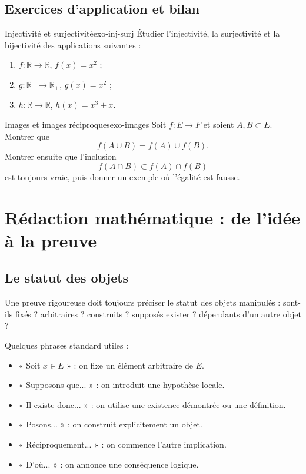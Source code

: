 \documentclass[11pt,a4paper]{article}
\newcommand{\R}{\mathbb{R}}
\begin{document}
\subsection{Exercices d'application et bilan}

\begin{exercicebox}{Injectivité et surjectivité}{exo-inj-surj}
Étudier l'injectivité, la surjectivité et la bijectivité des applications suivantes :
\begin{enumerate}
  \item $f:\R\to\R$, $f(x)=x^2$ ;
  \item $g:\R_+\to\R_+$, $g(x)=x^2$ ;
  \item $h:\R\to\R$, $h(x)=x^3+x$.
\end{enumerate}
\end{exercicebox}

\begin{exercicebox}{Images et images réciproques}{exo-images}
Soit $f:E\to F$ et soient $A,B\subset E$. Montrer que
\[
f(A\cup B)=f(A)\cup f(B).
\]
Montrer ensuite que l'inclusion
\[
f(A\cap B)\subset f(A)\cap f(B)
\]
est toujours vraie, puis donner un exemple où l'égalité est fausse.
\end{exercicebox}

\section{Rédaction mathématique : de l'idée à la preuve}

\subsection{Le statut des objets}

Une preuve rigoureuse doit toujours préciser le statut des objets manipulés : sont-ils fixés ? arbitraires ? construits ? supposés exister ? dépendants d'un autre objet ?

\begin{methodebox}
Quelques phrases standard utiles :
\begin{itemize}
  \item « Soit $x\in E$ » : on fixe un élément arbitraire de $E$.
  \item « Supposons que... » : on introduit une hypothèse locale.
  \item « Il existe donc... » : on utilise une existence démontrée ou une définition.
  \item « Posons... » : on construit explicitement un objet.
  \item « Réciproquement... » : on commence l'autre implication.
  \item « D'où... » : on annonce une conséquence logique.
\end{itemize}
\end{methodebox}
\end{document}
